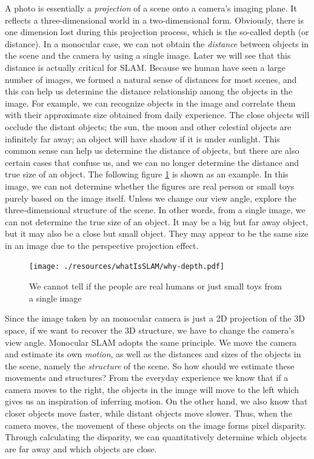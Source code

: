 A photo is essentially a \emph{projection} of a scene onto a camera's imaging plane. It reflects a three-dimensional world in a two-dimensional form. Obviously, there is one dimension lost during this projection process, which is the so-called depth (or distance). In a monocular case, we can not obtain the \emph{distance} between objects in the scene and the camera by using a single image. Later we will see that this distance is actually critical for SLAM. Because we human have seen a large number of images, we formed a natural sense of distances for most scenes, and this can help us determine the distance relationship among the objects in the image. For example, we can recognize objects in the image and correlate them with their approximate size obtained from daily experience. The close objects will occlude the distant objects; the sun, the moon and other celestial objects are infinitely far away; an object will have shadow if it is under sunlight. This common sense can help us determine the distance of objects, but there are also certain cases that confuse us, and we can no longer determine the distance and true size of an object. The following figure \ref{fig:why-depth} is shown as an example. In this image, we can not determine whether the figures are real person or small toys purely based on the image itself. Unless we change our view angle, explore the three-dimensional structure of the scene. In other words, from a single image, we can not determine the true size of an object. It may be a big but far away object, but it may also be a close but small object. They may appear to be the same size in an image due to the perspective projection effect.

\begin{figure}
	\centering
	\texttt{[image: ./resources/whatIsSLAM/why-depth.pdf]}
	\caption{We cannot tell if the people are real humans or just small toys from a single image}
	\label{fig:why-depth}
\end{figure}

Since the image taken by an monocular camera is just a 2D projection of the 3D space, if we want to recover the 3D structure, we have to change the camera's view angle. Monocular SLAM adopts the same principle. We move the camera and estimate its own \emph{motion}, as well as the distances and sizes of the objects in the scene, namely the \emph{structure} of the scene. So how should we estimate these movements and structures? From the everyday experience we know that if a camera moves to the right, the objects in the image will move to the left which gives us an inspiration of inferring motion. On the other hand, we also know that closer objects move faster, while distant objects move slower. Thus, when the camera moves, the movement of these objects on the image forms pixel disparity. Through calculating the disparity, we can quantitatively determine which objects are far away and which objects are close.

